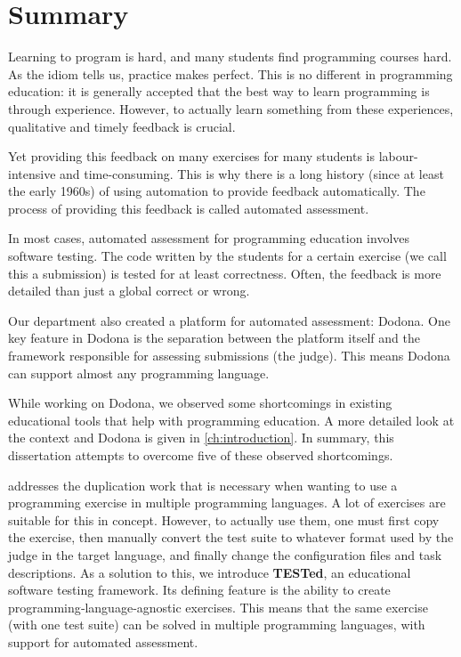 \documentclass[main]{subfiles}
\begin{document}
\chapter*{Summary}\label{ch:summary}


Learning to program is hard, and many students find programming courses hard.
As the idiom tells us, practice makes perfect.
This is no different in programming education: it is generally accepted that the best way to learn programming is through experience.
However, to actually learn something from these experiences, qualitative and timely feedback is crucial.

Yet providing this feedback on many exercises for many students is labour-intensive and time-consuming.
This is why there is a long history (since at least the early 1960s) of using automation to provide feedback automatically.
The process of providing this feedback is called automated assessment.

In most cases, automated assessment for programming education involves software testing.
The code written by the students for a certain exercise (we call this a submission) is tested for at least correctness.
Often, the feedback is more detailed than just a global correct or wrong.

Our department also created a platform for automated assessment: Dodona.
One key feature in Dodona is the separation between the platform itself and the framework responsible for assessing submissions (the judge).
This means Dodona can support almost any programming language.

While working on Dodona, we observed some shortcomings in existing educational tools that help with programming education.
A more detailed look at the context and Dodona is given in \cref{ch:introduction}.
In summary, this dissertation attempts to overcome five of these observed shortcomings.

 addresses the duplication work that is necessary when wanting to use a programming exercise in multiple programming languages.
A lot of exercises are suitable for this in concept.
However, to actually use them, one must first copy the exercise, then manually convert the test suite to whatever format used by the judge in the target language, and finally change the configuration files and task descriptions.
As a solution to this, we introduce \textbf{TESTed}, an educational software testing framework.
Its defining feature is the ability to
create programming‐language‐agnostic exercises.
This means that the same exercise (with one test suite) can be solved in multiple programming languages, with support for automated assessment.
\end{document}
